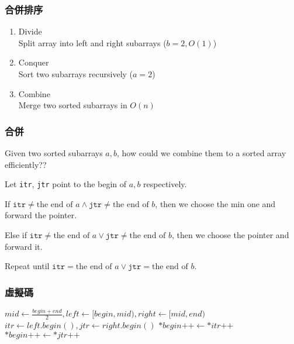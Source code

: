 \documentclass{beamer}
\begin{document}
\frame
{
	\frametitle{合併排序}
	
	\begin{enumerate}
		\item<1-> Divide\\Split array into left and right subarrays ($b = 2, O(1)$)
		\item<2-> Conquer\\Sort two subarrays recursively ($a = 2$)
		\item<3-> Combine\\Merge two sorted subarrays in $O(n)$
	\end{enumerate}
}

\frame
{
	\frametitle{合併}
	
	Given two sorted subarrays $a, b$, how could we combine them to a sorted array efficiently??\pause
	
	Let \texttt{itr}, \texttt{jtr} point to the begin of $a, b$ respectively.\pause
	
	If $\texttt{itr} \neq \text{the end of }a \land \texttt{jtr} \neq \text{the end of }b$, then we choose the min one and forward the pointer.\pause
	
	Else if $\texttt{itr} \neq \text{the end of }a \lor \texttt{jtr} \neq \text{the end of }b$, then we choose the pointer and forward it.\pause
	
	Repeat until $\texttt{itr} = \text{the end of }a \lor \texttt{jtr} = \text{the end of }b$.
}

\frame
{
	\frametitle{虛擬碼}
	
	\begin{algorithmic}
			\pause
				\State\Return
			\EndIf
			\pause
            \State$mid\gets\frac{begin+end}{2}, left\gets[begin, mid), right\gets[mid, end)$
            \pause
            \State{}
            \State{} 
            \pause
            \State$itr\gets left.begin(), jtr\gets right.begin()$
					\State$*begin\texttt{++}\gets*itr\texttt{++}$
				\Else
					\State$*begin\texttt{++}\gets*jtr\texttt{++}$
				\EndIf
            \EndWhile
        \EndProcedure
	\end{algorithmic}
}
\end{document}
